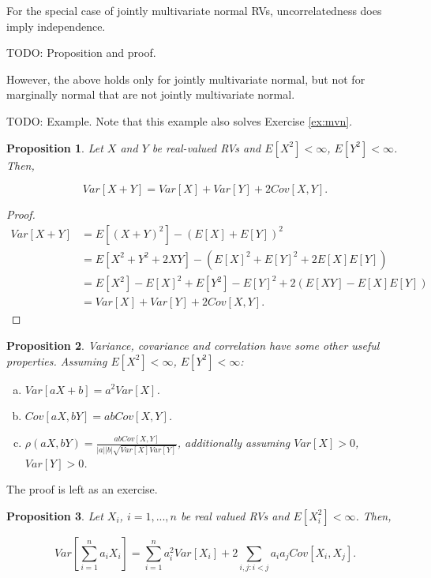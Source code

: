 \documentclass{book}
\theoremstyle{plain}%
\newtheorem{proposition}{Proposition}[section]
\theoremstyle{definition}
\begin{document}
For the special case of jointly multivariate normal RVs, uncorrelatedness does imply independence.

TODO: Proposition and proof.

However, the above holds only for jointly multivariate normal, but not for marginally normal that are not jointly multivariate normal.

TODO: Example. Note that this example also solves Exercise \ref{ex:mvn}.

\begin{proposition}
Let $X$ and $Y$ be real-valued RVs and $E[X^2] < \infty$, $E[Y^2] < \infty$. Then,

$$Var[X+Y] = Var[X] + Var[Y] + 2Cov[X,Y].$$
\end{proposition}

\begin{proof}
\begin{align*}
Var[X+Y] &= E[(X +Y)^2] - (E[X]+ E[Y])^2  \\
&= E[X^2 + Y^2 + 2XY] - (E[X]^2 + E[Y]^2 + 2E[X]E[Y])\\
&= E[X^2] - E[X]^2 + E[Y^2] - E[Y]^2 + 2(E[XY] - E[X]E[Y])\\
&= Var[X] + Var[Y] + 2Cov[X,Y].
\end{align*}
\end{proof}

\begin{proposition}
Variance, covariance and correlation have some other useful properties. Assuming $E[X^2] < \infty$, $E[Y^2] < \infty$:

\begin{enumerate}[(a)]
\item $Var[aX + b] = a^2Var[X]$.
\item $Cov[aX, bY] = abCov[X,Y]$.
\item $\rho(aX, bY) = \frac{abCov[X,Y]}{|a||b|\sqrt{Var[X]Var[Y]}}$, additionally assuming $Var[X] > 0$, $Var[Y] > 0$.
\end{enumerate}\label{prop:variance2}
\end{proposition}

The proof is left as an exercise.

\begin{proposition}
Let $X_i$, $i = 1,...,n$ be real valued RVs and $E[X_i^2] < \infty$. Then,

$$Var[\sum_{i=1}^n a_iX_i] = \sum_{i=1}^n a_i^2Var[X_i]+ 2\sum_{i,j:i<j}a_ia_jCov[X_i,X_j].$$
\end{proposition}
\end{document}
